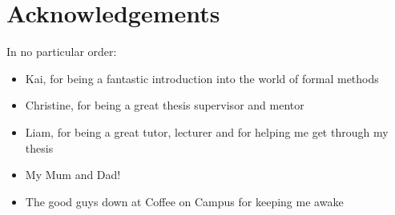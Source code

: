 \chapter*{Acknowledgements}\label{ack}

In no particular order:

\begin{itemize}
    \item Kai, for being a fantastic introduction into the world of formal methods
    \item Christine, for being a great thesis supervisor and mentor
    \item Liam, for being a great tutor, lecturer and for helping me get through my thesis
    \item My Mum and Dad!
    \item The good guys down at Coffee on Campus for keeping me awake 
\end{itemize}